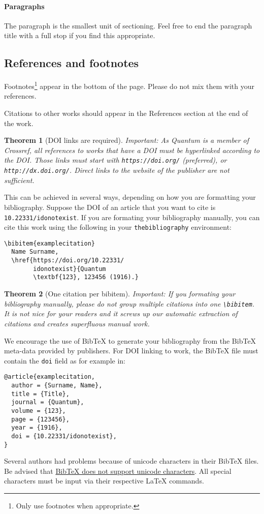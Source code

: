 \documentclass[a4paper,twocolumn,superscriptaddress,11pt,accepted=2017-05-09]{quantumarticle}
\newtheorem{theorem}{Theorem}
\begin{document}
\paragraph{Paragraphs}
The paragraph is the smallest unit of sectioning.
Feel free to end the paragraph title with a full stop if you find this appropriate.

\subsection{References and footnotes}
\label{sec:subsec1}
Footnotes\footnote{Only use footnotes when appropriate.} appear in the bottom of the page.
Please do not mix them with your references.

Citations to other works should appear in the References section at the end of the work.

\begin{theorem}[DOI links are required]
  Important: As Quantum is a member of Crossref, all references to works that have a DOI must be hyperlinked according to the DOI. Those links must start with \texttt{https://doi.org/} (preferred), or \texttt{http://dx.doi.org/}. Direct links to the website of the publisher are not sufficient.
\end{theorem}

This can be achieved in several ways, depending on how you are formatting your bibliography.
Suppose the DOI of an article \cite{examplecitation} that you want to cite is \texttt{10.22331/idonotexist}.
If you are formating your bibliography manually, you can cite this work using the following in your \texttt{thebibliography} environment:
\begin{verbatim}
\bibitem{examplecitation}
  Name Surname,
  \href{https://doi.org/10.22331/
        idonotexist}{Quantum
        \textbf{123}, 123456 (1916).}
\end{verbatim}

\begin{theorem}[One citation per bibitem]
  Important: If you formating your bibliography manually, please do not group multiple citations into one \texttt{\textbackslash{}bibitem}.
  It is not nice for your readers and it screws up our automatic extraction of citations and creates superfluous manual work.
\end{theorem}

We encourage the use of BibTeX to generate your bibliography from the BibTeX meta-data provided by publishers.
For DOI linking to work, the BibTeX file must contain the \texttt{doi} field as for example in:
\begin{verbatim}
@article{examplecitation,
  author = {Surname, Name},
  title = {Title},
  journal = {Quantum},
  volume = {123},
  page = {123456},
  year = {1916},
  doi = {10.22331/idonotexist},
}
\end{verbatim}
Several authors had problems because of unicode characters in their BibTeX files.
Be advised that \href{http://wiki.lyx.org/BibTeX/Tips}{BibTeX does not support unicode characters}.
All special characters must be input via their respective LaTeX commands.
\end{document}
